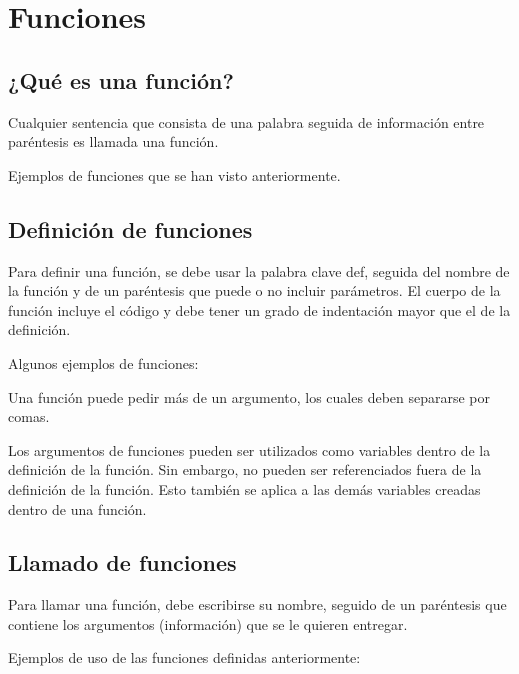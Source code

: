 \documentclass{report}
\begin{document}
\clearpage\chapter{Funciones}

\section{¿Qué es una función?}

Cualquier sentencia que consista de una palabra seguida de información entre paréntesis es llamada una función.

Ejemplos de funciones que se han visto anteriormente.


\section{Definición de funciones}

Para definir una función, se debe usar la palabra clave def, seguida del nombre de la función y de un paréntesis que puede o no incluir parámetros. El cuerpo de la función incluye el código y debe tener un grado de indentación mayor que el de la definición.

Algunos ejemplos de funciones:



Una función puede pedir más de un argumento, los cuales deben separarse por comas.



Los argumentos de funciones pueden ser utilizados como variables dentro de la definición de la función. Sin embargo, no pueden ser referenciados fuera de la definición de la función. Esto también se aplica a las demás variables creadas dentro de una función.

\section{Llamado de funciones}

Para llamar una función, debe escribirse su nombre, seguido de un paréntesis que contiene los argumentos (información) que se le quieren entregar.

Ejemplos de uso de las funciones definidas anteriormente:
\end{document}
